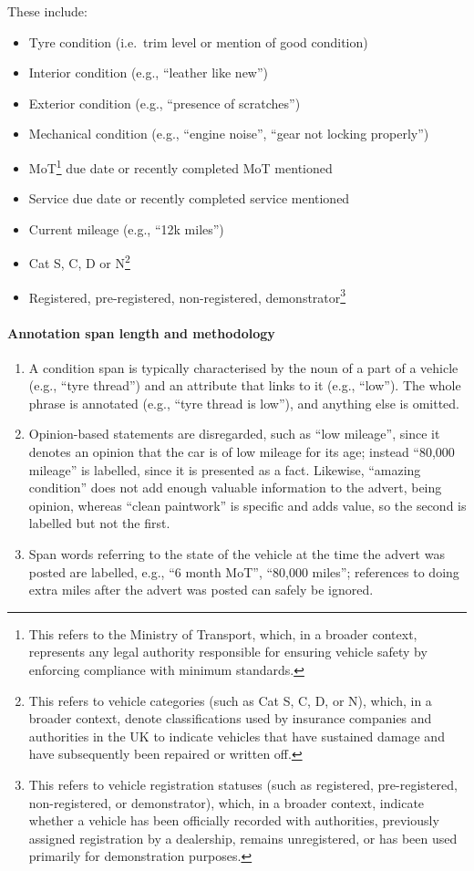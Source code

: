 \documentclass[11pt,a4paper]{article}
\begin{document}
These include:
\begin{itemize}
    \item Tyre condition (i.e.\ trim level or mention of good condition)
    \item Interior condition (e.g., ``leather like new'')
    \item Exterior condition (e.g., ``presence of scratches'')
    \item Mechanical condition (e.g., ``engine noise'', ``gear not locking properly'')
    \item MoT\footnote{This refers to the Ministry of Transport, which, in a broader context,
    represents any legal authority responsible for ensuring vehicle safety by enforcing
    compliance with minimum standards.} due date or recently completed MoT mentioned
    \item Service due date or recently completed service mentioned
    \item Current mileage (e.g., ``12k miles'')
    \item Cat S, C, D or N\footnote{This refers to vehicle categories (such as Cat S, C, D, or
    N), which, in a broader context, denote classifications used by insurance companies and
    authorities in the UK to indicate vehicles that have sustained damage and have subsequently
    been repaired or written off.}
    \item Registered, pre-registered, non-registered, demonstrator\footnote{This refers to
    vehicle registration statuses (such as registered, pre-registered, non-registered, or
    demonstrator), which, in a broader context, indicate whether a vehicle has been officially
    recorded with authorities, previously assigned registration by a dealership, remains
    unregistered, or has been used primarily for demonstration purposes.}
\end{itemize}

\paragraph{Annotation span length and methodology}
\begin{enumerate}
\item A condition span is typically characterised by the noun of a part of a vehicle (e.g.,
``tyre thread'') and an attribute that links to it (e.g., ``low''). The whole phrase is annotated
(e.g., ``tyre thread is low''), and anything else is omitted.
\item Opinion-based statements are disregarded, such as ``low mileage'', since it denotes an
opinion that the car is of low mileage for its age; instead ``80,000 mileage'' is labelled, since
it is presented as a fact. Likewise, ``amazing condition'' does not add enough valuable
information to the advert, being opinion, whereas ``clean paintwork'' is specific and adds
value, so the second is labelled but not the first.
\item Span words referring to the state of the vehicle at the time the advert was posted are
labelled, e.g., ``6 month MoT'', ``80,000 miles''; references to doing extra miles after the
advert was posted can safely be ignored.
\end{enumerate}
\end{document}
